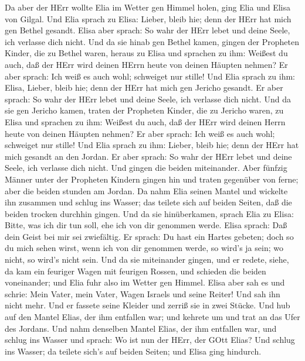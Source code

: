  Da aber der HErr wollte Elia im Wetter gen Himmel holen,
ging Elia und Elisa von Gilgal.  Und Elia sprach zu Elisa:
Lieber, bleib hie; denn der HErr hat mich gen Bethel gesandt. Elisa aber
sprach: So wahr der HErr lebet und deine Seele, ich verlasse dich nicht.
Und da sie hinab gen Bethel kamen,  gingen der Propheten
Kinder, die zu Bethel waren, heraus zu Elisa und sprachen zu ihm:
Weißest du auch, daß der HErr wird deinen HErrn heute von deinen Häupten
nehmen? Er aber sprach: Ich weiß es auch wohl; schweiget nur stille!
 Und Elia sprach zu ihm: Elisa, Lieber, bleib hie; denn der
HErr hat mich gen Jericho gesandt. Er aber sprach: So wahr der HErr
lebet und deine Seele, ich verlasse dich nicht. Und da sie gen Jericho
kamen,  traten der Propheten Kinder, die zu Jericho waren,
zu Elisa und sprachen zu ihm: Weißest du auch, daß der HErr wird deinen
Herrn heute von deinen Häupten nehmen? Er aber sprach: Ich weiß es auch
wohl; schweiget nur stille!  Und Elia sprach zu ihm: Lieber,
bleib hie; denn der HErr hat mich gesandt an den Jordan. Er aber sprach:
So wahr der HErr lebet und deine Seele, ich verlasse dich nicht. Und
gingen die beiden miteinander.  Aber fünfzig Männer unter
der Propheten Kindern gingen hin und traten gegenüber von ferne; aber
die beiden stunden am Jordan.  Da nahm Elia seinen Mantel
und wickelte ihn zusammen und schlug ins Wasser; das teilete sich auf
beiden Seiten, daß die beiden trocken durchhin gingen.  Und
da sie hinüberkamen, sprach Elia zu Elisa: Bitte, was ich dir tun soll,
ehe ich von dir genommen werde. Elisa sprach: Daß dein Geist bei mir sei
zwiefältig.  Er sprach: Du hast ein Hartes gebeten; doch so
du mich sehen wirst, wenn ich von dir genommen werde, so wird's ja sein;
wo nicht, so wird's nicht sein.  Und da sie miteinander
gingen, und er redete, siehe, da kam ein feuriger Wagen mit feurigen
Rossen, und schieden die beiden voneinander; und Elia fuhr also im
Wetter gen Himmel.  Elisa aber sah es und schrie: Mein
Vater, mein Vater, Wagen Israels und seine Reiter! Und sah ihn nicht
mehr. Und er fassete seine Kleider und zerriß sie in zwei Stücke.
 Und hub auf den Mantel Elias, der ihm entfallen war; und
kehrete um und trat an das Ufer des Jordans.  Und nahm
denselben Mantel Elias, der ihm entfallen war, und schlug ins Wasser und
sprach: Wo ist nun der HErr, der GOtt Elias? Und schlug ins Wasser; da
teilete sich's auf beiden Seiten; und Elisa ging hindurch. 
